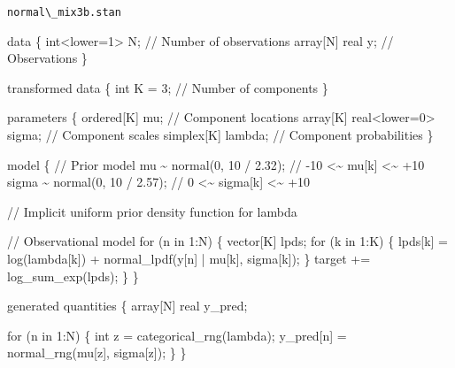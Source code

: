 \documentclass[
  letterpaper,
  DIV=11,
  numbers=noendperiod]{scrartcl}
\newenvironment{Shaded}{\begin{snugshade}}{\end{snugshade}}
\newcommand{\CommentTok}[1]{\textcolor[rgb]{0.37,0.37,0.37}{#1}}
\newcommand{\ControlFlowTok}[1]{\textcolor[rgb]{0.00,0.23,0.31}{#1}}
\newcommand{\DataTypeTok}[1]{\textcolor[rgb]{0.68,0.00,0.00}{#1}}
\newcommand{\DecValTok}[1]{\textcolor[rgb]{0.68,0.00,0.00}{#1}}
\newcommand{\FloatTok}[1]{\textcolor[rgb]{0.68,0.00,0.00}{#1}}
\newcommand{\KeywordTok}[1]{\textcolor[rgb]{0.00,0.23,0.31}{#1}}
\newcommand{\NormalTok}[1]{\textcolor[rgb]{0.00,0.23,0.31}{#1}}
\begin{document}
\begin{codelisting}

\caption{\texttt{normal\textbackslash\_mix3b.stan}}

\begin{Shaded}
\begin{Highlighting}[]
\KeywordTok{data}\NormalTok{ \{}
  \DataTypeTok{int}\NormalTok{\textless{}}\KeywordTok{lower}\NormalTok{=}\DecValTok{1}\NormalTok{\textgreater{} N;  }\CommentTok{// Number of observations}
  \DataTypeTok{array}\NormalTok{[N] }\DataTypeTok{real}\NormalTok{ y; }\CommentTok{// Observations}
\NormalTok{\}}

\KeywordTok{transformed data}\NormalTok{ \{}
  \DataTypeTok{int}\NormalTok{ K = }\DecValTok{3}\NormalTok{; }\CommentTok{// Number of components}
\NormalTok{\}}

\KeywordTok{parameters}\NormalTok{ \{}
  \DataTypeTok{ordered}\NormalTok{[K] mu;                }\CommentTok{// Component locations}
  \DataTypeTok{array}\NormalTok{[K] }\DataTypeTok{real}\NormalTok{\textless{}}\KeywordTok{lower}\NormalTok{=}\DecValTok{0}\NormalTok{\textgreater{} sigma; }\CommentTok{// Component scales}
  \DataTypeTok{simplex}\NormalTok{[K] lambda;            }\CommentTok{// Component probabilities}
\NormalTok{\}}

\KeywordTok{model}\NormalTok{ \{}
  \CommentTok{// Prior model}
\NormalTok{  mu \textasciitilde{} normal(}\DecValTok{0}\NormalTok{, }\DecValTok{10}\NormalTok{ / }\FloatTok{2.32}\NormalTok{);    }\CommentTok{// {-}10 \textless{}\textasciitilde{}  mu[k]   \textless{}\textasciitilde{} +10}
\NormalTok{  sigma \textasciitilde{} normal(}\DecValTok{0}\NormalTok{, }\DecValTok{10}\NormalTok{ / }\FloatTok{2.57}\NormalTok{); }\CommentTok{//   0 \textless{}\textasciitilde{} sigma[k] \textless{}\textasciitilde{} +10}

  \CommentTok{// Implicit uniform prior density function for lambda}

  \CommentTok{// Observational model}
  \ControlFlowTok{for}\NormalTok{ (n }\ControlFlowTok{in} \DecValTok{1}\NormalTok{:N) \{}
    \DataTypeTok{vector}\NormalTok{[K] lpds;}
    \ControlFlowTok{for}\NormalTok{ (k }\ControlFlowTok{in} \DecValTok{1}\NormalTok{:K) \{}
\NormalTok{      lpds[k] = log(lambda[k]) + normal\_lpdf(y[n] | mu[k], sigma[k]);}
\NormalTok{    \}}
    \KeywordTok{target +=}\NormalTok{ log\_sum\_exp(lpds);}
\NormalTok{  \}}
\NormalTok{\}}

\KeywordTok{generated quantities}\NormalTok{ \{}
  \DataTypeTok{array}\NormalTok{[N] }\DataTypeTok{real}\NormalTok{ y\_pred;}

  \ControlFlowTok{for}\NormalTok{ (n }\ControlFlowTok{in} \DecValTok{1}\NormalTok{:N) \{}
    \DataTypeTok{int}\NormalTok{ z = categorical\_rng(lambda);}
\NormalTok{    y\_pred[n] = normal\_rng(mu[z], sigma[z]);}
\NormalTok{  \}}
\NormalTok{\}}
\end{Highlighting}
\end{Shaded}

\end{codelisting}
\end{document}
